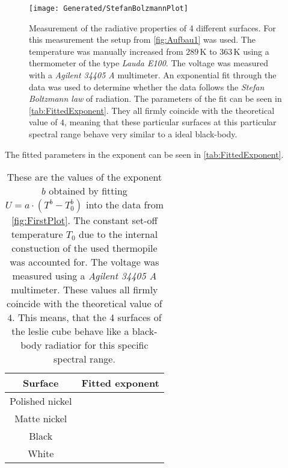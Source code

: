 \documentclass[a4paper,10pt,twocolumn]{article}
\begin{document}
    \begin{figure}
               \begin{center}
               \texttt{[image: Generated/StefanBolzmannPlot]}
               \caption{Measurement of the radiative properties of 4 different surfaces.
               For this measurement the setup from \autoref{fig:Aufbau1} was used. The temperature was manually increased from $ 289\,$K to $363\,$K using a thermometer of the type \textit{Lauda E100}.
               The voltage was measured with a \textit{Agilent 34405 A} multimeter.
               An exponential fit through the data was used to determine whether the data follows the \textit{Stefan Boltzmann law} of radiation.
               The parameters of the fit can be seen in \autoref{tab:FittedExponent}.
               They all firmly coincide with the theoretical value of $4$, meaning that these particular surfaces at this particular
               spectral range behave very similar to a ideal black-body.}
               \label{fig:FirstPlot}
               \end{center}
    \end{figure}
    The fitted parameters in the exponent can be seen in \autoref{tab:FittedExponent}.
    \begin{table}[htbp]          %
        \centering
        \begin{tabular*}{0.9\linewidth}{@{\extracolsep{\fill}}cc}
            \hline
            \hline
            \rule[-7pt]{0pt}{23pt}  Surface  &  Fitted exponent 	 \\
            \hline
            \rule[-5pt]{0pt}{23pt}   Polished nickel   &   \ExponentPolished  	 \\
            \rule[-5pt]{0pt}{23pt}   Matte nickel   & \ExponentMatt     	 \\
            \rule[-5pt]{0pt}{23pt}   Black  &   \ExponentBlack  	 \\
            \rule[-5pt]{0pt}{23pt}   White   &   \ExponentWhite  	 \\
            \hline
            \hline
        \end{tabular*}
        \normalsize
        \caption[]{These are the values of the exponent $b$ obtained by fitting $U = a\cdot(T^b - T_0^b) $ into the data from \autoref{fig:FirstPlot}.
        The constant set-off temperature $T_0$ due to the internal constuction of the used thermopile was accounted for.
        The voltage was measured using a \textit{Agilent 34405 A} multimeter.
        These values all firmly coincide with the theoretical value of $4$.
        This means, that the 4 surfaces of the leslie cube behave like a black-body radiatior for this specific spectral range.}  %
        \label{tab:FittedExponent}                             %
    \end{table}
\end{document}
